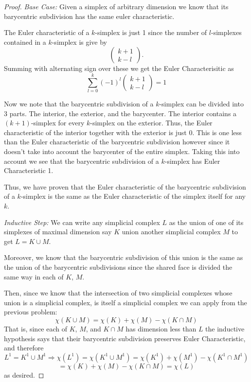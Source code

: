 \documentclass[10pt]{article}
\begin{document}
\begin{proof}
\emph{Base Case: }Given a simplex of arbitrary dimension we know that its barycentric subdivision has the same euler characteristic.

The Euler characteristic of a $k$-simplex is just 1 since the number of $l$-simplexes contained in a $k$-simplex is give by 
\[\left( \begin{array}{c} k+1 \\k-l \end{array}\right).\]
Summing with alternating sign over these we get the Euler Characterisitic as 
\[\sum_{l=0}^k (-1)^l \left( \begin{array}{c} k+1 \\k-l \end{array}\right) = 1\]

Now we note that the barycentric subdivision of a $k$-simplex can be divided into 3 parts. The interior, the exterior, and the barycenter. The interior contains a $(k+1)$-simplex for every $k$-simplex on the exterior. Thus, the Euler characteristic of the interior together with the exterior is just 0. This is one less than the Euler characteristic of the barycentric subdivision however since it doesn't take into account the barycenter of the entire simplex. Taking this into account we see that the barycentric subdivision of a $k$-simplex has Euler Characteristic 1. 

Thus, we have proven that the Euler characteristic of the barycentric subdivision of a $k$-simplex is the same as the Euler characteristic of the simplex itself for any $k$.

\emph{Inductive Step: }
We can write any simplicial complex $L$ as the union of one of its simplexes of maximal dimension say $K$ union another simplicial complex $M$ to get $L = K \cup M$.

Moreover, we know that the barycentric subdivision of this union is the same as the union of the barycentric subdivisions since the shared face is divided the same way in each of $K$, $M$.

Then, since we know that the intersection of two simplicial complexes whose union is a simplicial complex, is itself a simplicial complex we can apply from the previous problem:
\[\chi(K \cup M ) = \chi(K) + \chi(M) - \chi(K\cap M)\]
That is, since each of $K$, $M$, and $K \cap M$ has dimension less than $L$ the inductive hypothesis says that their barycentric subdivision preserves Euler Characteristic, and therefore
\[L^1=K^1 \cup M^1 \Rightarrow \chi(L^1) = \chi(K^1 \cup M^1) =  \chi(K^1) + \chi(M^1) - \chi(K^1\cap M^1) \]
\[=  \chi(K) + \chi(M) - \chi(K\cap M) = \chi(L)\]
as desired.
\end{proof}
\end{document}
